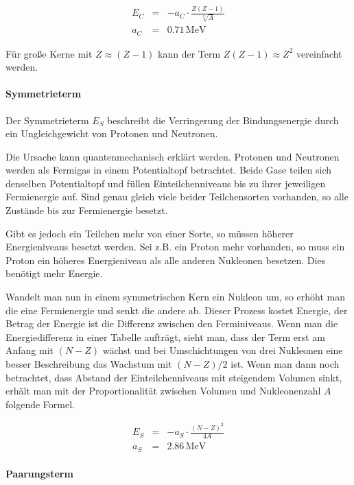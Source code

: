 \documentclass[12pt,a4paper]{scrartcl}
\numberwithin{equation}{section} %
\renewcommand{\[}{} %
\renewcommand{\]}{\noindent} %
\begin{document}
\[
\begin{eqnarray}
    E_C &=& - a_C\cdot \frac{Z(Z-1)}{\sqrt[3]{A}} \label{Coulombterm} \\
    a_C &=& 0.71\mathrm{\,MeV}
\end{eqnarray}
\]

Für große Kerne mit \(Z\approx(Z-1)\) kann der Term
\(Z(Z-1)\approx Z^2\) vereinfacht werden.

\hypertarget{symmetrieterm}{%
\paragraph{Symmetrieterm}\label{symmetrieterm}}

Der Symmetrieterm \(E_S\) beschreibt die Verringerung der
Bindungsenergie durch ein Ungleichgewicht von Protonen und Neutronen.

Die Ursache kann quantenmechanisch erklärt werden. Protonen und
Neutronen werden als Fermigas in einem Potentialtopf betrachtet. Beide
Gase teilen sich denselben Potentialtopf und füllen Einteilchenniveaus
bis zu ihrer jeweiligen Fermienergie auf. Sind genau gleich viele beider
Teilchensorten vorhanden, so alle Zustände bis zur Fermienergie besetzt.

Gibt es jedoch ein Teilchen mehr von einer Sorte, so müssen höherer
Energieniveaus besetzt werden. Sei z.B. ein Proton mehr vorhanden, so
muss ein Proton ein höheres Energieniveau als alle anderen Nukleonen
besetzen. Dies benötigt mehr Energie.

Wandelt man nun in einem symmetrischen Kern ein Nukleon um, so erhöht
man die eine Fermienergie und senkt die andere ab. Dieser Prozess kostet
Energie, der Betrag der Energie ist die Differenz zwischen den
Ferminiveaus. Wenn man die Energiedifferenz in einer Tabelle aufträgt,
sieht man, dass der Term erst am Anfang mit \((N-Z)\) wächst und bei
Umschichtungen von drei Nukleonen eine besser Beschreibung das Wachstum
mit \((N-Z)/2\) ist. Wenn man dann noch betrachtet, dass Abstand der
Einteilchenniveaus mit steigendem Volumen sinkt, erhält man mit der
Proportionalität zwischen Volumen und Nukleonenzahl \(A\) folgende
Formel.

\[
\begin{eqnarray}
    E_S &=& - a_S\cdot \frac{(N-Z)^2}{4A} \label{Symmetrieterm} \\
    a_S &=& 2.86\mathrm{\,MeV}
\end{eqnarray}
\]

\hypertarget{paarungsterm}{%
\paragraph{Paarungsterm}\label{paarungsterm}}
\end{document}
